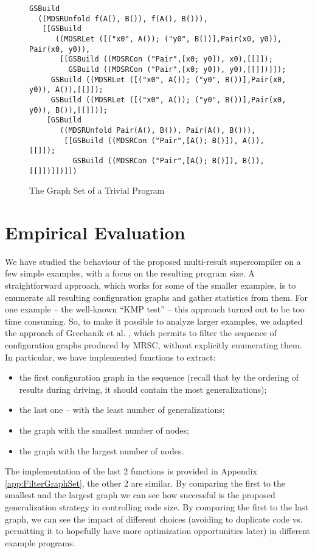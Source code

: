 \documentclass[submission,copyright,creativecommons]{eptcs}
\begin{document}
\begin{figure}
\begin{lstlisting}
GSBuild
  ((MDSRUnfold f(A(), B()), f(A(), B())),
   [[GSBuild
      ((MDSRLet ([("x0", A()); ("y0", B())],Pair(x0, y0)), Pair(x0, y0)),
       [[GSBuild ((MDSRCon ("Pair",[x0; y0]), x0),[[]]);
         GSBuild ((MDSRCon ("Pair",[x0; y0]), y0),[[]])]]);
     GSBuild ((MDSRLet ([("x0", A()); ("y0", B())],Pair(x0, y0)), A()),[[]]);
     GSBuild ((MDSRLet ([("x0", A()); ("y0", B())],Pair(x0, y0)), B()),[[]])];
    [GSBuild
       ((MDSRUnfold Pair(A(), B()), Pair(A(), B())),
        [[GSBuild ((MDSRCon ("Pair",[A(); B()]), A()),[[]]);
          GSBuild ((MDSRCon ("Pair",[A(); B()]), B()),[[]])]])]])
\end{lstlisting}
\caption{The Graph Set of a Trivial Program}
\label{fig:TrivGraphSet}
\end{figure}

\section{Empirical Evaluation}\label{sec:EmpEval}

We have studied the behaviour of the proposed multi-result supercompiler on a few simple
examples, with a focus on the resulting program size.
A straightforward approach, which works for some of the smaller examples,
is to enumerate all resulting configuration graphs and gather statistics from them.
For one example -- the well-known ``KMP test'' -- this approach turned out to be too
time consuming.
So, to make it possible to analyze larger examples, we adapted the approach 
of Grechanik et al. \cite{Romanenko2014StagedMRSC}, which permits to filter
the sequence of configuration graphs produced by MRSC, without explicitly
enumerating them.
In particular, we have implemented functions to extract:
\begin{itemize}
  \item the first configuration graph in the sequence (recall that by the ordering of 
    results during driving, it should contain the most generalizations);
  \item the last one -- with the least number of generalizations;
  \item the graph with the smallest number of nodes;
  \item the graph with the largest number of nodes.
\end{itemize}
The implementation of the last 2 functions is provided in Appendix \ref{app:FilterGraphSet},
the other 2 are similar.
By comparing the first to the smallest and the largest graph we can see how 
successful is the proposed generalization strategy in controlling code size.
By comparing the first to the last graph, we can see the impact of different choices
(avoiding to duplicate code vs. permitting it to hopefully have more optimization opportunities later)
in different example programs.
\end{document}
